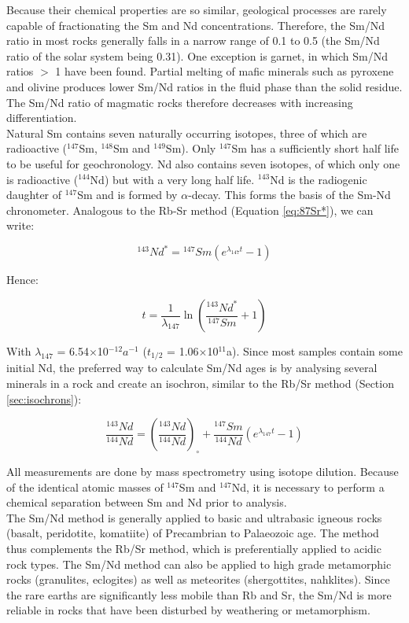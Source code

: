 Because their chemical properties are so similar, geological processes
are rarely capable of fractionating the Sm and Nd
concentrations. Therefore, the Sm/Nd ratio in most rocks generally
falls in a narrow range of 0.1 to 0.5 (the Sm/Nd ratio of the solar
system being 0.31). One exception is garnet, in which Sm/Nd ratios $>$
1 have been found. Partial melting of mafic minerals such as pyroxene
and olivine produces lower Sm/Nd ratios in the fluid phase than the
solid residue.  The Sm/Nd ratio of magmatic rocks therefore decreases
with increasing differentiation.\\

Natural Sm contains seven naturally occurring isotopes, three of which
are radioactive ($^{147}$Sm, $^{148}$Sm and $^{149}$Sm). Only
$^{147}$Sm has a sufficiently short half life to be useful for
geochronology.  Nd also contains seven isotopes, of which only one is
radioactive ($^{144}$Nd) but with a very long half life. $^{143}$Nd is
the radiogenic daughter of $^{147}$Sm and is formed by
$\alpha$-decay. This forms the basis of the Sm-Nd chronometer.
Analogous to the Rb-Sr method (Equation \ref{eq:87Sr*}), we can write:

\begin{equation}
^{143}Nd^* = {}^{147}Sm (e^{\lambda_{147} t} - 1)
\label{eq:144Nd*}
\end{equation}

Hence:

\begin{equation}
t = \frac{1}{\lambda_{147}}
\ln\left(\frac{^{143}Nd^*}{^{147}Sm} + 1 \right)
\label{eq:tNd}
\end{equation}

With $\lambda_{147}$ = 6.54$\times$10$^{-12} a^{-1}$ ($t_{1/2}$ =
1.06$\times$10$^{11}$a).  Since most samples contain some initial Nd,
the preferred way to calculate Sm/Nd ages is by analysing several
minerals in a rock and create an isochron, similar to the Rb/Sr method
(Section \ref{sec:isochrons}):

\begin{equation}
\frac{^{143}Nd}{^{144}Nd} =
\left(\frac{^{143}Nd}{^{144}Nd}\right)_{\circ} +
\frac{^{147}Sm}{^{144}Nd} \left(e^{\lambda_{147}t} -
1\right)
\label{eq:143Nd147Nd}
\end{equation}

All measurements are done by mass spectrometry using isotope dilution.
Because of the identical atomic masses of $^{147}$Sm and $^{147}$Nd,
it is necessary to perform a chemical separation between Sm and Nd
prior to analysis.\\

The Sm/Nd method is generally applied to basic and ultrabasic igneous
rocks (basalt, peridotite, komatiite) of Precambrian to Palaeozoic
age. The method thus complements the Rb/Sr method, which is
preferentially applied to acidic rock types. The Sm/Nd method can also
be applied to high grade metamorphic rocks (granulites, eclogites) as
well as meteorites (shergottites, nahklites). Since the rare earths
are significantly less mobile than Rb and Sr, the Sm/Nd is more
reliable in rocks that have been disturbed by weathering or
metamorphism.
